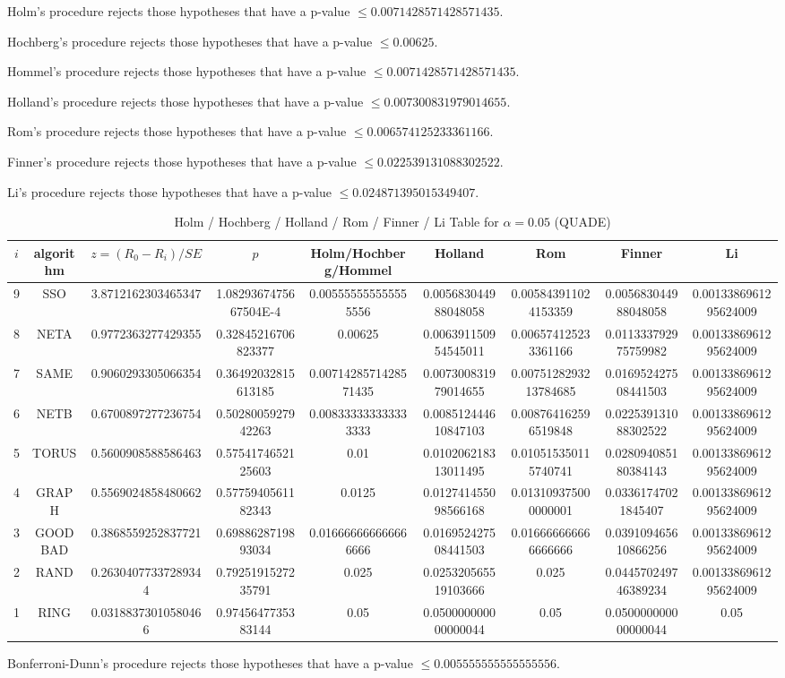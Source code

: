 \documentclass[a4paper,10pt]{article}
\begin{document}
\begin{landscape}
Holm's procedure rejects those hypotheses that have a p-value $\le0.0071428571428571435$.


Hochberg's procedure rejects those hypotheses that have a p-value $\le0.00625$.


Hommel's procedure rejects those hypotheses that have a p-value $\le0.0071428571428571435$.


Holland's procedure rejects those hypotheses that have a p-value $\le0.007300831979014655$.


Rom's procedure rejects those hypotheses that have a p-value $\le0.006574125233361166$.


Finner's procedure rejects those hypotheses that have a p-value $\le0.022539131088302522$.


Li's procedure rejects those hypotheses that have a p-value $\le0.024871395015349407$.



\newpage

\begin{table}[!htp]
\centering\scriptsize
\caption{Holm / Hochberg / Holland / Rom / Finner / Li Table for $\alpha=0.05$ (QUADE)}
\begin{tabular}{ccccccccc}
$i$&algorithm&$z=(R_0 - R_i)/SE$&$p$&Holm/Hochberg/Hommel&Holland&Rom&Finner&Li\\
\hline
9& SSO&3.8712162303465347&1.0829367475667504E-4&0.005555555555555556&0.005683044988048058&0.005843911024153359&0.005683044988048058&0.0013386961295624009\\
8& NETA&0.9772363277429355&0.32845216706823377&0.00625&0.006391150954545011&0.006574125233361166&0.011333792975759982&0.0013386961295624009\\
7& SAME&0.9060293305066354&0.36492032815613185&0.0071428571428571435&0.007300831979014655&0.0075128293213784685&0.016952427508441503&0.0013386961295624009\\
6& NETB&0.6700897277236754&0.5028005927942263&0.008333333333333333&0.008512444610847103&0.008764162596519848&0.022539131088302522&0.0013386961295624009\\
5& TORUS&0.5600908588586463&0.5754174652125603&0.01&0.010206218313011495&0.010515350115740741&0.028094085180384143&0.0013386961295624009\\
4& GRAPH&0.5569024858480662&0.5775940561182343&0.0125&0.012741455098566168&0.013109375000000001&0.03361747021845407&0.0013386961295624009\\
3& GOODBAD&0.3868559252837721&0.6988628719893034&0.016666666666666666&0.016952427508441503&0.016666666666666666&0.039109465610866256&0.0013386961295624009\\
2& RAND&0.26304077337289344&0.7925191527235791&0.025&0.025320565519103666&0.025&0.044570249746389234&0.0013386961295624009\\
1& RING&0.03188373010580466&0.9745647735383144&0.05&0.050000000000000044&0.05&0.050000000000000044&0.05\\
\hline
\end{tabular}
\end{table}
Bonferroni-Dunn's procedure rejects those hypotheses that have a p-value $\le0.005555555555555556$.



\end{landscape}
\end{document}
